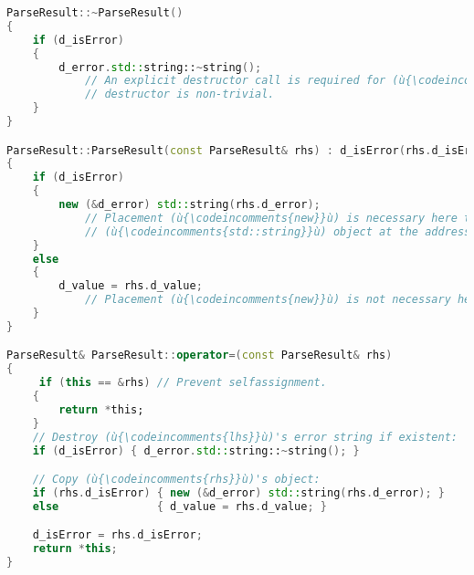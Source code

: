 %
%
%
%
\begin{lstlisting}[language=C++]
ParseResult::~ParseResult()
{
    if (d_isError)
    {
        d_error.std::string::~string();
            // An explicit destructor call is required for (ù{\codeincomments{d\_error}}ù) because its
            // destructor is non-trivial.
    }
}

ParseResult::ParseResult(const ParseResult& rhs) : d_isError(rhs.d_isError)
{
    if (d_isError)
    {
        new (&d_error) std::string(rhs.d_error);
            // Placement (ù{\codeincomments{new}}ù) is necessary here to begin the lifetime of a
            // (ù{\codeincomments{std::string}}ù) object at the address of (ù{\codeincomments{d\_error}}ù).
    }
    else
    {
        d_value = rhs.d_value;
            // Placement (ù{\codeincomments{new}}ù) is not necessary here as (ù{\codeincomments{int}}ù) is a trivial type.
    }
}

ParseResult& ParseResult::operator=(const ParseResult& rhs)
{
     if (this == &rhs) // Prevent selfassignment.
    {
        return *this;
    }
    // Destroy (ù{\codeincomments{lhs}}ù)'s error string if existent:
    if (d_isError) { d_error.std::string::~string(); }

    // Copy (ù{\codeincomments{rhs}}ù)'s object:
    if (rhs.d_isError) { new (&d_error) std::string(rhs.d_error); }
    else               { d_value = rhs.d_value; }

    d_isError = rhs.d_isError;
    return *this;
}
\end{lstlisting}
